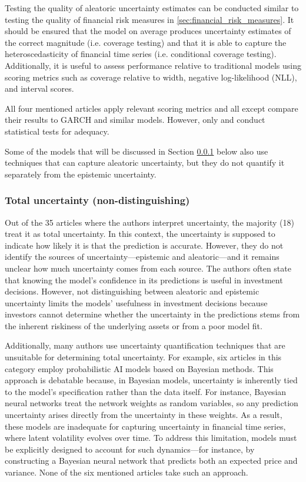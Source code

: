 Testing the quality of aleatoric uncertainty estimates can be conducted similar to testing the quality of financial risk measures in \ref{sec:financial_risk_measures}. It should be ensured that the model on average produces uncertainty estimates of the correct magnitude (i.e. coverage testing) and that it is able to capture the heteroscedasticity of financial time series (i.e. conditional coverage testing). Additionally, it is useful to assess performance relative to traditional models using scoring metrics such as coverage relative to width, negative log-likelihood (NLL), and interval scores.

All four mentioned articles apply relevant scoring metrics and all except \textcite{Wang2024GoldForecasting} compare their results to GARCH and similar models. However, only \parencite{arian2022encoded} and \parencite{Horenko2020} conduct statistical tests for adequacy.

Some of the models that will be discussed in Section \ref{sec:total_uncertainty} below also use techniques that can capture aleatoric uncertainty, but they do not quantify it separately from the epistemic uncertainty.


\subsubsection{Total uncertainty (non-distinguishing)}
\label{sec:total_uncertainty}

Out of the 35 articles where the authors interpret uncertainty, the majority (18) treat it as total uncertainty. In this context, the uncertainty is supposed to indicate how likely it is that the prediction is accurate. However, they do not identify the sources of uncertainty—epistemic and aleatoric—and it remains unclear how much uncertainty comes from each source. The authors often state that knowing the model's confidence in its predictions is useful in investment decisions. However, not distinguishing between aleatoric and epistemic uncertainty limits the models' usefulness in investment decisions because investors cannot determine whether the uncertainty in the predictions stems from the inherent riskiness of the underlying assets or from a poor model fit.

Additionally, many authors use uncertainty quantification techniques that are unsuitable for determining total uncertainty. For example, six articles in this category employ probabilistic AI models based on Bayesian methods. This approach is debatable because, in Bayesian models, uncertainty is inherently tied to the model's specification rather than the data itself. For instance, Bayesian neural networks treat the network weights as random variables, so any prediction uncertainty arises directly from the uncertainty in these weights. As a result, these models are inadequate for capturing uncertainty in financial time series, where latent volatility evolves over time. To address this limitation, models must be explicitly designed to account for such dynamics—for instance, by constructing a Bayesian neural network that predicts both an expected price and variance. None of the six mentioned articles take such an approach.

